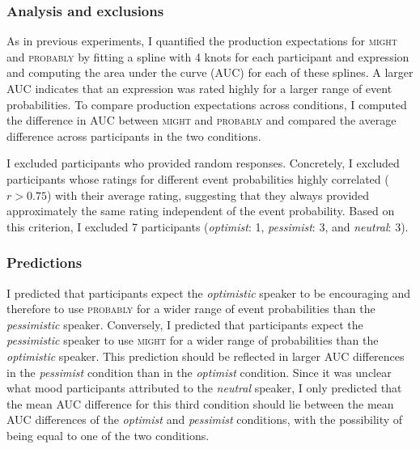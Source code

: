\subsubsection{Analysis and exclusions}

As in previous experiments, I quantified the production expectations for \textsc{might} and \textsc{probably} by fitting a spline with 4 knots for each participant and expression and computing the area under the curve (AUC) for each of these splines. A larger AUC indicates that an expression was rated highly for a larger range of event probabilities. To compare production expectations across conditions, I computed the difference in AUC between \textsc{might} and \textsc{probably} and compared the average difference across participants in the two conditions.

I excluded participants who provided random responses. Concretely, I excluded participants whose ratings for different event probabilities highly correlated ($r>0.75$) with their average rating, suggesting that they always provided approximately the same rating independent of the event probability. Based on this criterion, I excluded 7 participants (\textit{optimist}: 1, \textit{pessimist}: 3, and \textit{neutral}: 3).

\subsubsection{Predictions}

I predicted that participants expect the \textit{optimistic} speaker to be encouraging and therefore to use \textsc{probably} for a wider range of event probabilities than the \textit{pessimistic} speaker. Conversely, I predicted that participants expect the \textit{pessimistic} speaker to use \textsc{might} for a wider range of probabilities than the \textit{optimistic} speaker. This prediction should be reflected in larger AUC differences in the \textit{pessimist} condition than in the \textit{optimist} condition. Since it was unclear what mood participants attributed to the \textit{neutral} speaker, I only predicted that the mean AUC difference for this third condition should lie between the mean AUC differences of the \textit{optimist} and \textit{pessimist} conditions, with the possibility of being equal to one of the two conditions.

